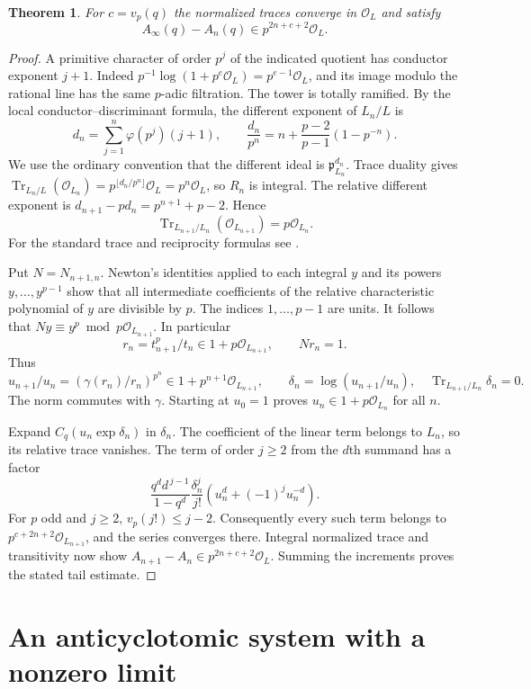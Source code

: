 \documentclass[11pt]{article}
\newtheorem{theorem}{Theorem}
\newcommand{\cO}{\mathcal O}
\begin{document}
\begin{theorem}\label{th:stability}
For $c=v_p(q)$ the normalized traces converge in $\cO_L$ and satisfy
\[
 A_\infty(q)-A_n(q)\in p^{2n+c+2}\cO_L .
\]
\end{theorem}
\begin{proof}
A primitive character of order $p^j$ of the indicated quotient has conductor exponent $j+1$. Indeed $p^{-1}\log(1+p^e\cO_L)=p^{e-1}\cO_L$, and its image modulo the rational line has the same $p$-adic filtration. The tower is totally ramified. By the local conductor--discriminant formula, the different exponent of $L_n/L$ is
\[
 d_n=\sum_{j=1}^n\varphi(p^j)(j+1),\qquad
 \frac{d_n}{p^n}=n+\frac{p-2}{p-1}(1-p^{-n}).
\]
We use the ordinary convention that the different ideal is $\mathfrak p_{L_n}^{d_n}$. Trace duality gives $\operatorname{Tr}_{L_n/L}(\cO_{L_n})=p^{\lfloor d_n/p^n\rfloor}\cO_L=p^n\cO_L$, so $R_n$ is integral. The relative different exponent is $d_{n+1}-p d_n=p^{n+1}+p-2$. Hence
\[
 \operatorname{Tr}_{L_{n+1}/L_n}(\cO_{L_{n+1}})=p\cO_{L_n}.
\]
For the standard trace and reciprocity formulas see \cite{serre}.

Put $N=N_{n+1,n}$. Newton's identities applied to each integral $y$ and its powers $y,\ldots,y^{p-1}$ show that all intermediate coefficients of the relative characteristic polynomial of $y$ are divisible by $p$. The indices $1,\ldots,p-1$ are units. It follows that $Ny\equiv y^p\bmod p\cO_{L_{n+1}}$. In particular
\[
 r_n=t_{n+1}^p/t_n\in1+p\cO_{L_{n+1}},\qquad N r_n=1.
\]
Thus
\[
 u_{n+1}/u_n=(\gamma(r_n)/r_n)^{p^n}\in1+p^{n+1}\cO_{L_{n+1}},
 \qquad \delta_n=\log(u_{n+1}/u_n),\quad \operatorname{Tr}_{L_{n+1}/L_n}\delta_n=0.
\]
The norm commutes with $\gamma$. Starting at $u_0=1$ proves $u_n\in1+p\cO_{L_n}$ for all $n$.

Expand $C_q(u_n\exp\delta_n)$ in $\delta_n$. The coefficient of the linear term belongs to $L_n$, so its relative trace vanishes. The term of order $j\ge2$ from the $d$th summand has a factor
\[
 \frac{q^d d^{\,j-1}}{1-q^d}\frac{\delta_n^j}{j!}(u_n^d+(-1)^j u_n^{-d}).
\]
For $p$ odd and $j\ge2$, $v_p(j!)\le j-2$. Consequently every such term belongs to $p^{c+2n+2}\cO_{L_{n+1}}$, and the series converges there. Integral normalized trace and transitivity now show $A_{n+1}-A_n\in p^{2n+c+2}\cO_L$. Summing the increments proves the stated tail estimate.
\end{proof}

\section{An anticyclotomic system with a nonzero limit}
\end{document}
